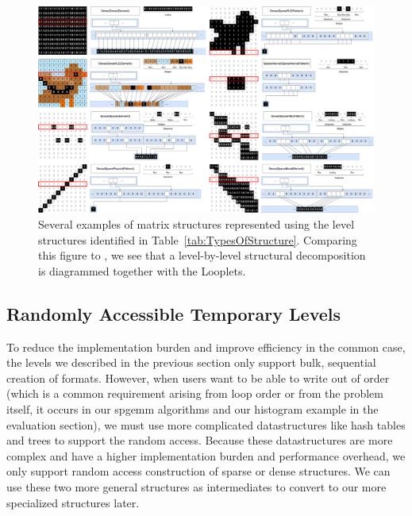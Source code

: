     \begin{figure}
        \centering
        \includegraphics[width=\linewidth]{Structures.png}\hfill%
        \caption{Several examples of matrix structures represented using the
        level structures identified in Table~\ref{tab:TypesOfStructure}.
        Comparing this figure to \cite[Figure 3]{ahrens_looplets_2023}, we see
        that a level-by-level structural decomposition is diagrammed together
        with the Looplets.}
        \label{fig:structuraldiversity}
    \end{figure}

\subsection{Randomly Accessible Temporary Levels}
To reduce the implementation burden and improve efficiency in the common case, the levels we described in the previous section only support bulk,
sequential creation of formats. However, when users want to be able to write out
of order (which is a common requirement arising from loop order or from the
problem itself, it occurs in our spgemm algorithms and our histogram example in
the evaluation section), we must use more complicated datastructures like hash
tables and trees to support the random access. Because these datastructures are
more complex and have a higher implementation burden and performance overhead,
we only support random access construction of sparse or dense structures.  We
can use these two more general structures as intermediates to convert to our
more specialized structures later.



